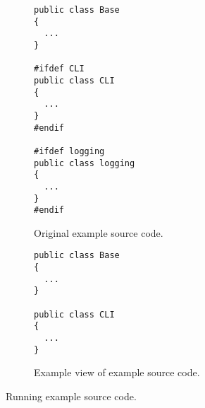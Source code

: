 \begin{figure}
  \centering
  \begin{subfigure}[b]{0.45\textwidth}
    \centering
    \begin{BVerbatim}
public class Base
{
  ...
}

#ifdef CLI
public class CLI
{
  ...
}
#endif

#ifdef logging
public class logging
{
  ...
}
#endif
    \end{BVerbatim}
    \caption{Original example source code.}
    \label{fig:example:original}
  \end{subfigure}
  \hfill
  \begin{subfigure}[b]{0.45\textwidth}
    \centering
    \begin{BVerbatim}
public class Base
{
  ...
}

public class CLI
{
  ...
}
    \end{BVerbatim}
    \caption{Example view of example source code.}
    \label{fig:example:view}
  \end{subfigure}
  \caption{Running example source code.}
  \label{fig:runningexample}
\end{figure}
